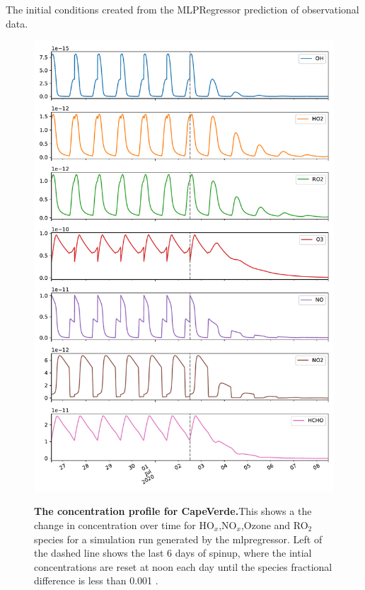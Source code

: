 \begin{table}[H]
    \centering
    \label{tab:icsmetric}
\begin{small}

\end{small}

\caption{The initial conditions created from the MLPRegressor prediction of observational data.}
\end{table}
\newpage


\begin{figure}[H]
    \centering
\includegraphics[width=.9\textwidth]{figures_c3/mlpregressor/conc_cape.pdf}
\label{fig:ccape}
\caption{\textbf{The concentration profile for CapeVerde.}This shows a the change in concentration over time for HO$_x$,NO$_x$,Ozone and RO$_2$ species for a simulation run generated by the mlpregressor. Left of the dashed line shows the last 6 days of spinup, where the intial concentrations are reset at noon each day until the species fractional difference is less than 0.001 .}
\end{figure}

